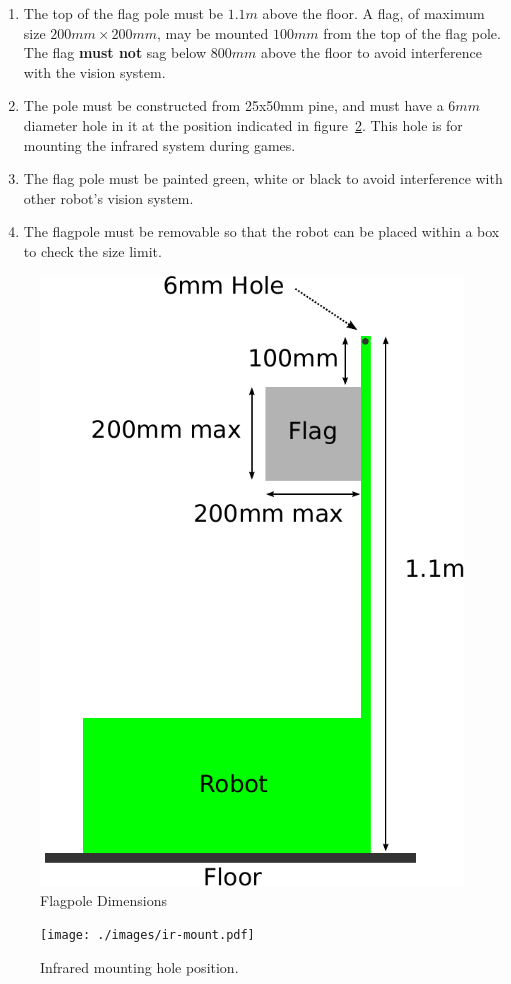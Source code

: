 \begin{enumerate}
\item The top of the flag pole must be $1.1m$ above the floor.  A flag, of maximum size $200mm \times 200mm$, may be mounted $100mm$ from the top of the flag pole.  The flag \textbf{must not} sag below $800mm$ above the floor to avoid interference with the vision system.

\item The pole must be constructed from 25x50mm pine, and must have a $6mm$ diameter hole in it at the position indicated in figure~\ref{fig:ir-mount}.  This hole is for mounting the infrared system during games.

\item The flag pole must be painted green, white or black to avoid interference with other robot's vision system.

\item The flagpole must be removable so that the robot can be placed within a box to check the size limit.
\end{enumerate}

\begin{figure}
 \begin{center}
  \includegraphics[keepaspectratio, scale =0.7]{./images/flag-2011.pdf}
  \caption{\label{fig:flag}Flagpole Dimensions}
 \end{center}
\end{figure}

\begin{figure}
 \begin{center}
  \texttt{[image: ./images/ir-mount.pdf]}
  \caption{\label{fig:ir-mount}Infrared mounting hole position.}
 \end{center}
\end{figure}

\clearpage
